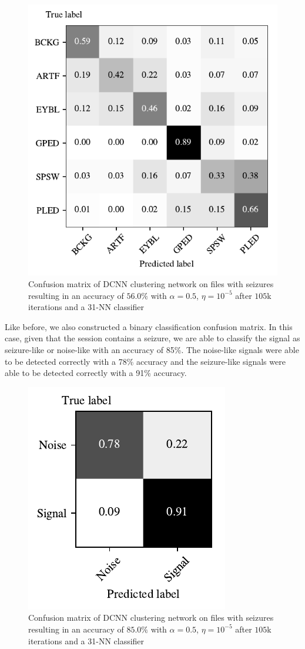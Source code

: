 \begin{figure}[!ht]
	\centering
	\includegraphics[width=0.55\linewidth]{pictures/conf_mat_exp_with_seizure.pdf}
	\caption[Confusion Matrix on Sessions with Seizure-Like Signals]{Confusion matrix of DCNN clustering network on files with seizures resulting in an accuracy of $56.0\%$ with $\alpha = 0.5$, $\eta = 10^{-5}$ after $105$k iterations and a 31-NN classifier}\label{fig:conf_mat_exp_with_seizure}  
\end{figure}

Like before, we also constructed a binary classification confusion matrix. In this case, given that the session contains a seizure, we are able to classify the signal as seizure-like or noise-like with an accuracy of 85\%. The noise-like signals were able to be detected correctly with a 78\% accuracy and the seizure-like signals were able to be detected correctly with a 91\% accuracy. 


\begin{figure}[!ht]
	\centering
	\includegraphics[width=0.425\linewidth]{pictures/conf_mat_exp_with_seizure_pooled.pdf}
	\caption[Binary Confusion Matrix on Sessions with Seizure-Like Signals]{Confusion matrix of DCNN clustering network on files with seizures resulting in an accuracy of $85.0\%$ with $\alpha = 0.5$, $\eta = 10^{-5}$ after $105$k iterations and a 31-NN classifier}\label{fig:conf_mat_exp_with_seizure_pooled}  
\end{figure}


